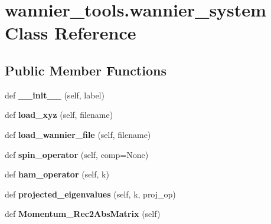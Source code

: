 \hypertarget{classwannier__tools_1_1wannier__system}{}\section{wannier\+\_\+tools.\+wannier\+\_\+system Class Reference}
\label{classwannier__tools_1_1wannier__system}
\subsection*{Public Member Functions}
\begin{DoxyCompactItemize}
\item 
def {\bfseries \+\_\+\+\_\+init\+\_\+\+\_\+} (self, label)\hypertarget{classwannier__tools_1_1wannier__system_a151284373ee50c477a6815a1f4487195}{}\label{classwannier__tools_1_1wannier__system_a151284373ee50c477a6815a1f4487195}

\item 
def {\bfseries load\+\_\+xyz} (self, filename)\hypertarget{classwannier__tools_1_1wannier__system_a845c993eb3dc8ddbce05062883d5b1f1}{}\label{classwannier__tools_1_1wannier__system_a845c993eb3dc8ddbce05062883d5b1f1}

\item 
def {\bfseries load\+\_\+wannier\+\_\+file} (self, filename)\hypertarget{classwannier__tools_1_1wannier__system_a0ae2338ce73e8b0fd08ffbf4c462aefb}{}\label{classwannier__tools_1_1wannier__system_a0ae2338ce73e8b0fd08ffbf4c462aefb}

\item 
def {\bfseries spin\+\_\+operator} (self, comp=None)\hypertarget{classwannier__tools_1_1wannier__system_a54cc2f95c64dc0ba5bcffbc2543179bb}{}\label{classwannier__tools_1_1wannier__system_a54cc2f95c64dc0ba5bcffbc2543179bb}

\item 
def {\bfseries ham\+\_\+operator} (self, k)\hypertarget{classwannier__tools_1_1wannier__system_a6df5aaa2172f2da72d1a6d49f2c3206e}{}\label{classwannier__tools_1_1wannier__system_a6df5aaa2172f2da72d1a6d49f2c3206e}

\item 
def {\bfseries projected\+\_\+eigenvalues} (self, k, proj\+\_\+op)\hypertarget{classwannier__tools_1_1wannier__system_a2a79f28a672e647403e037afe921f250}{}\label{classwannier__tools_1_1wannier__system_a2a79f28a672e647403e037afe921f250}

\item 
def {\bfseries Momentum\+\_\+\+Rec2\+Abs\+Matrix} (self)\hypertarget{classwannier__tools_1_1wannier__system_a08086c7ac54b43f0a6add1ab0c2154c0}{}\label{classwannier__tools_1_1wannier__system_a08086c7ac54b43f0a6add1ab0c2154c0}


\end{DoxyCompactItemize}
